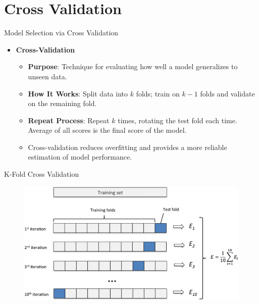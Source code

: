 \documentclass[serif, aspectratio=169]{beamer}
\begin{document}
\section{Cross Validation}

\begin{frame}{Model Selection via Cross Validation}
    \begin{itemize}
        \item \textbf{Cross-Validation}
        \medskip
        \begin{itemize}\itemsep1em
            \item \justifying \textbf{Purpose}:
            Technique for evaluating how well a model generalizes to unseen data.
            \item \justifying \textbf{How It Works}:
            Split data into $k$ folds; train on $k-1$ folds and validate on the remaining fold.
            \item \justifying \textbf{Repeat Process}:
            Repeat $k$ times, rotating the test fold each time. Average of all scores is the final score of the model.
            \item \justifying Cross-validation
            reduces overfitting and provides a more reliable estimation of model performance.
        \end{itemize}
    \end{itemize}
\end{frame}


\begin{frame}{K-Fold Cross Validation}
    \begin{figure}
        \centering
        \includegraphics[width=.8\textwidth]{pic/Figure_28.png}
    \end{figure}
    \vfill
\end{frame}
\end{document}
